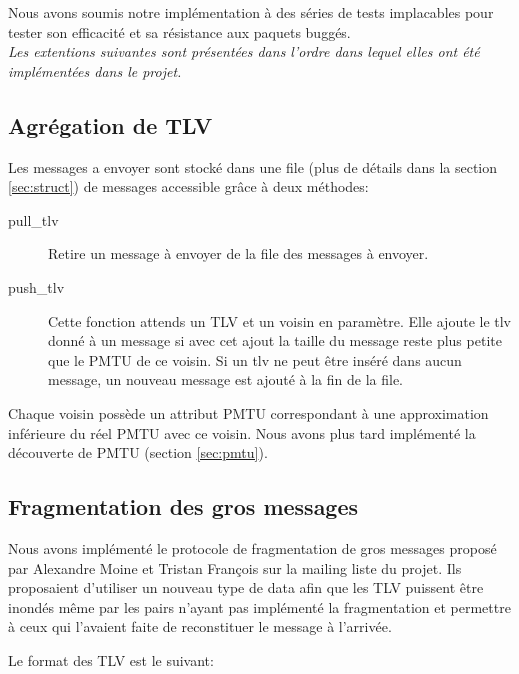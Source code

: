 \documentclass[a4paper,10pt]{article} %
\begin{document}
Nous avons soumis notre implémentation à des séries de tests implacables pour tester son efficacité et sa résistance aux paquets buggés.\\


\textit{Les extentions suivantes sont présentées dans l'ordre dans lequel elles ont été implémentées dans le projet.}

\subsection{Agrégation de TLV\label{sec:agrega}}
Les messages a envoyer sont stocké dans une file (plus de détails dans la section \ref{sec:struct}) de messages accessible grâce à deux méthodes:

\begin{description}
\item[pull\_tlv] Retire un message à envoyer de la file des messages à envoyer.
\item[push\_tlv] Cette fonction attends un TLV et un voisin en paramètre. Elle ajoute le tlv donné à un message si avec cet ajout la taille du message reste plus petite que le PMTU de ce voisin. Si un tlv ne peut être inséré dans aucun message, un nouveau message est ajouté à la fin de la file.
\end{description}

Chaque voisin possède un attribut \textrm{PMTU} correspondant à une approximation inférieure du réel \textrm{PMTU} avec ce voisin. Nous avons plus tard implémenté la découverte de PMTU (section \ref{sec:pmtu}).


\subsection{Fragmentation des gros messages\label{sec:frag}}
Nous avons implémenté le protocole de fragmentation de gros messages proposé par \textrm{Alexandre Moine} et \textrm{Tristan François} sur la mailing liste du projet. Ils proposaient d'utiliser un nouveau type de data afin que les TLV puissent être inondés même par les pairs n'ayant pas implémenté la fragmentation et permettre à ceux qui l'avaient faite de reconstituer le message à l'arrivée.

Le format des TLV est le suivant:
\end{document}
